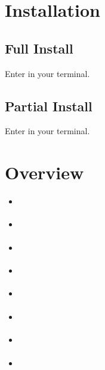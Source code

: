 \documentclass[letterpaper,10pt,english]{sphinxmanual}
\begin{document}
\chapter{Installation}
\label{\detokenize{Installation:installation}}\label{\detokenize{Installation::doc}}

\section{Full Install}
\label{\detokenize{Installation:full-install}}
\sphinxAtStartPar
Enter  in your terminal.


\section{Partial Install}
\label{\detokenize{Installation:partial-install}}
\sphinxAtStartPar
Enter  in your terminal.

\sphinxstepscope


\chapter{Overview}
\label{\detokenize{Sub-Packages:overview}}\label{\detokenize{Sub-Packages::doc}}\begin{itemize}
\item {} 
\sphinxAtStartPar
{\hyperref[\detokenize{Sub-Packages:coloring-module}]{}}

\item {} 
\sphinxAtStartPar
{\hyperref[\detokenize{Sub-Packages:event-processing-module}]{}}

\item {} 
\sphinxAtStartPar
{\hyperref[\detokenize{Sub-Packages:io-module}]{}}

\item {} 
\sphinxAtStartPar
{\hyperref[\detokenize{Sub-Packages:image-processing-module}]{}}

\item {} 
\sphinxAtStartPar
{\hyperref[\detokenize{Sub-Packages:interactive-visuals-module}]{}}

\item {} 
\sphinxAtStartPar
{\hyperref[\detokenize{Sub-Packages:reorganization-module}]{}}

\item {} 
\sphinxAtStartPar
{\hyperref[\detokenize{Sub-Packages:signal-processing-module}]{}}

\item {} 
\sphinxAtStartPar
{\hyperref[\detokenize{Sub-Packages:static-visuals-module}]{}}

\end{itemize}
\end{document}
